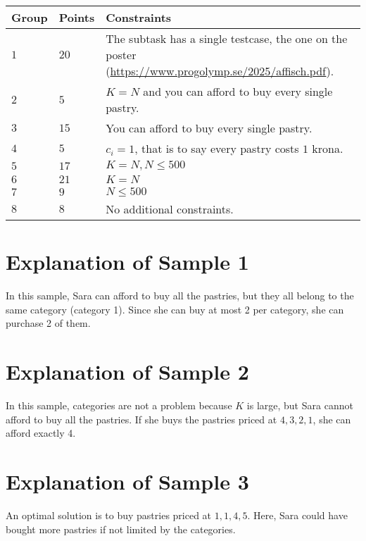 \noindent
\begin{tabular}{| l | l | p{12cm} |}
  \hline
  \textbf{Group} & \textbf{Points} & \textbf{Constraints} \\ \hline
  $1$    & $20$       & The subtask has a single testcase, the one on the poster (\url{https://www.progolymp.se/2025/affisch.pdf}). \\ \hline 
  $2$    & $5$        & $K=N$ and you can afford to buy every single pastry. \\ \hline
  $3$    & $15$       & You can afford to buy every single pastry. \\ \hline
  $4$    & $5$        & $c_i=1$, that is to say every pastry costs $1$ krona. \\ \hline
  $5$    & $17$       & $K=N, N \leq 500$ \\ \hline
  $6$    & $21$       & $K=N$ \\ \hline
  $7$    & $9$        & $N \leq 500$ \\ \hline
  $8$    & $8$        & No additional constraints. \\ \hline
\end{tabular}

\section*{Explanation of Sample 1}
In this sample, Sara can afford to buy all the pastries, but they all belong to the same category (category 1).
Since she can buy at most 2 per category, she can purchase 2 of them.

\section*{Explanation of Sample 2}
In this sample, categories are not a problem because $K$ is large, but Sara cannot afford to buy all the pastries.
If she buys the pastries priced at $4, 3, 2, 1$, she can afford exactly 4.

\section*{Explanation of Sample 3}
An optimal solution is to buy pastries priced at $1, 1, 4, 5$. Here, Sara could have bought more pastries if not
limited by the categories.
